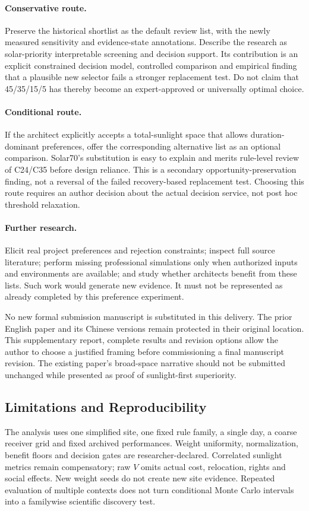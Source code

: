\documentclass{llncs}
\begin{document}
\paragraph{Conservative route.} Preserve the historical shortlist as the default review list, with the newly measured sensitivity and evidence-state annotations. Describe the research as solar-priority interpretable screening and decision support. Its contribution is an explicit constrained decision model, controlled comparison and empirical finding that a plausible new selector fails a stronger replacement test. Do not claim that 45/35/15/5 has thereby become an expert-approved or universally optimal choice.

\paragraph{Conditional route.} If the architect explicitly accepts a total-sunlight space that allows duration-dominant preferences, offer the corresponding alternative list as an optional comparison. Solar70's substitution is easy to explain and merits rule-level review of C24/C35 before design reliance. This is a secondary opportunity-preservation finding, not a reversal of the failed recovery-based replacement test. Choosing this route requires an author decision about the actual decision service, not post hoc threshold relaxation.

\paragraph{Further research.} Elicit real project preferences and rejection constraints; inspect full source literature; perform missing professional simulations only when authorized inputs and environments are available; and study whether architects benefit from these lists. Such work would generate new evidence. It must not be represented as already completed by this preference experiment.

No new formal submission manuscript is substituted in this delivery. The prior English paper and its Chinese versions remain protected in their original location. This supplementary report, complete results and revision options allow the author to choose a justified framing before commissioning a final manuscript revision. The existing paper's broad-space narrative should not be submitted unchanged while presented as proof of sunlight-first superiority.

\subsection{Limitations and Reproducibility}
The analysis uses one simplified site, one fixed rule family, a single day, a coarse receiver grid and fixed archived performances. Weight uniformity, normalization, benefit floors and decision gates are researcher-declared. Correlated sunlight metrics remain compensatory; raw $V$ omits actual cost, relocation, rights and social effects. New weight seeds do not create new site evidence. Repeated evaluation of multiple contexts does not turn conditional Monte Carlo intervals into a familywise scientific discovery test.
\end{document}
